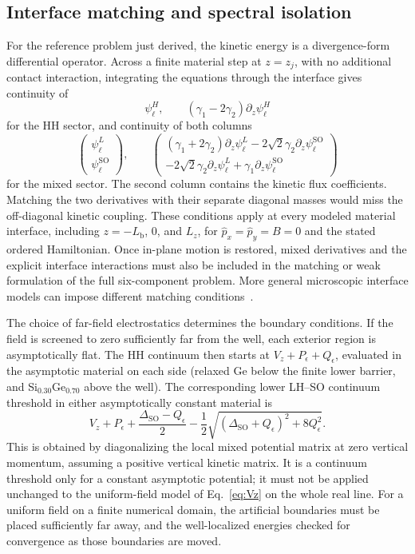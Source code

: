 \documentclass[10pt,letterpaper]{article}
\newcommand{\ep}{\epsilon}
\newcommand{\SO}{\mathrm{SO}}
\begin{document}
\subsection{Interface matching and spectral isolation}

For the reference problem just derived, the kinetic energy is a divergence-form differential operator. Across a finite material step at $z=z_j$, with no additional contact interaction, integrating the equations through the interface gives continuity of
\begin{equation}
\psi_\ell^H,\qquad
(\gamma_1-2\gamma_2)\partial_z\psi_\ell^H
\label{eq:HHmatching}
\end{equation}
for the HH sector, and continuity of both columns
\begin{equation}
\begin{pmatrix}\psi_\ell^L\\\psi_\ell^{\SO}\end{pmatrix},
\qquad
\begin{pmatrix}
(\gamma_1+2\gamma_2)\partial_z\psi_\ell^L
-2\sqrt2\gamma_2\partial_z\psi_\ell^{\SO}\\
-2\sqrt2\gamma_2\partial_z\psi_\ell^L
+\gamma_1\partial_z\psi_\ell^{\SO}
\end{pmatrix}
\label{eq:LHmatching}
\end{equation}
for the mixed sector. The second column contains the kinetic flux coefficients. Matching the two derivatives with their separate diagonal masses would miss the off-diagonal kinetic coupling. These conditions apply at every modeled material interface, including $z=-L_{\mathrm b}$, $0$, and $L_z$, for $ \hat{p}_ x= \hat{p}_ y=B=0$ and the stated ordered Hamiltonian. Once in-plane motion is restored, mixed derivatives and the explicit interface interactions must also be included in the matching or weak formulation of the full six-component problem. More general microscopic interface models can impose different matching conditions~\cite{foreman,rodina}.

The choice of far-field electrostatics determines the boundary conditions. If the field is screened to zero sufficiently far from the well, each exterior region is asymptotically flat. The HH continuum then starts at $V_z+P_\ep+Q_\ep$, evaluated in the asymptotic material on each side (relaxed Ge below the finite lower barrier, and Si$_{0.30}$Ge$_{0.70}$ above the well). The corresponding lower LH--SO continuum threshold in either asymptotically constant material is
\begin{equation}
V_z+P_\ep+\frac{\Delta_{\SO}-Q_\ep}{2}
-\frac12\sqrt{(\Delta_{\SO}+Q_\ep)^2+8Q_\ep^2}.
\label{eq:mixedthreshold}
\end{equation}
This is obtained by diagonalizing the local mixed potential matrix at zero vertical momentum, assuming a positive vertical kinetic matrix. It is a continuum threshold only for a constant asymptotic potential; it must not be applied unchanged to the uniform-field model of Eq.~\eqref{eq:Vz} on the whole real line. For a uniform field on a finite numerical domain, the artificial boundaries must be placed sufficiently far away, and the well-localized energies checked for convergence as those boundaries are moved.
\end{document}
